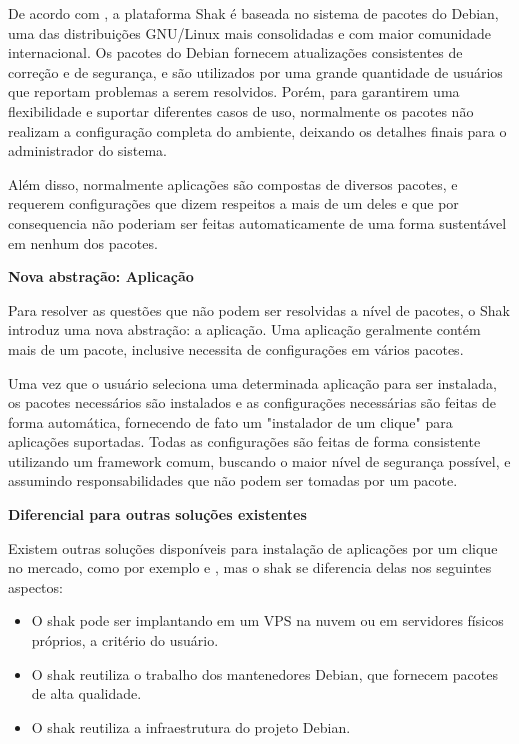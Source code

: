 De acordo com \cite{shak2015}, a plataforma Shak é baseada no sistema de pacotes
do Debian, uma das distribuições GNU/Linux mais consolidadas e com maior comunidade internacional. Os
pacotes do Debian fornecem atualizações consistentes de correção e de segurança,
e são utilizados por uma grande quantidade de usuários que reportam problemas a
serem resolvidos. Porém, para garantirem uma flexibilidade e suportar diferentes
casos de uso, normalmente os pacotes não realizam a configuração completa do ambiente,
deixando os detalhes finais para o administrador do sistema.

Além disso, normalmente aplicações são compostas de diversos pacotes, e
requerem configurações que dizem respeitos a mais de um deles e que por consequencia não poderiam ser
feitas automaticamente de uma forma sustentável em nenhum dos pacotes.

\textbf{Nova abstração: Aplicação}

Para resolver as questões que não podem ser resolvidas a nível de pacotes, o
Shak introduz uma nova abstração: a aplicação. Uma aplicação geralmente
contém mais de um pacote, inclusive necessita de configurações em vários pacotes.

Uma vez que o usuário seleciona uma determinada aplicação para
ser instalada, os pacotes necessários são instalados e as configurações
necessárias são feitas de forma automática, fornecendo de fato um "instalador
de um clique" para aplicações suportadas. Todas as configurações são feitas de
forma consistente utilizando um framework comum, buscando o maior nível de
segurança possível, e assumindo responsabilidades que não podem ser tomadas por
um pacote.

\textbf{Diferencial para outras soluções existentes}

Existem outras soluções disponíveis para instalação de aplicações por um clique no
mercado, como por exemplo \cite{bitnami} e \cite{sandstormio}, mas o shak se
diferencia delas nos seguintes aspectos:

\begin{itemize}
  \item O shak pode ser implantando em um VPS na nuvem ou em servidores físicos
    próprios, a critério do usuário.

  \item O shak reutiliza o trabalho dos mantenedores Debian, que fornecem pacotes
    de alta qualidade.

  \item O shak reutiliza a infraestrutura do projeto Debian.

\end{itemize}

